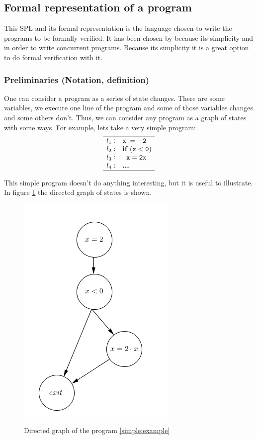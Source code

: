 \subsection{Formal representation of a program}

This \gls{SPL} and its formal representation is the language chosen to write the programs to be formally verified.
%
It has been chosen by \citep{thesisAle} because its simplicity and  in order to write concurrent programs. 
%
Because its simplicity it is a great option to do formal verification with it.


\subsubsection{Preliminaries (Notation, definition)}

One can consider a program as a series of state changes. There are some variables, we execute one line of the program and some of those variables changes and some others don't. Thus, we can consider any program as a graph of states with some ways. For example, lets take a very simple program:
%
\[
	\begin{array}{l@{\hspace{0.3em}}c@{\hspace{1em}}l}
	\hline
		l_1 & : & \mathtt{x := -2} \\
		l_2 & : & \mathtt{\textbf{if } (x<0)} \\
		l_3 & : & \mathtt{\;\;x = 2x} \\
		l_4 & : & \mathtt{\textbf{...}}\\
	\hline
	\end{array}
\]
\label{simple:example}

This simple program doesn't do anything interesting, but it is useful to illustrate.
%
In figure \ref{ex:simpleExample} the directed graph of states is shown.

\begin{figure}[hbtp]
\label{ex:simpleExample}
\centering
\includegraphics[scale=0.6]{graphics/simpleExample.png}
\caption{Directed graph of the program \ref{simple:example}}
\end{figure}


